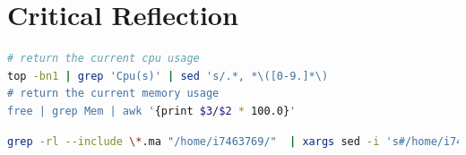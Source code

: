 \documentclass[11pt]{article}
\begin{document}
\section{Critical Reflection}




\newpage
\appendix

\begin{lstlisting}[language=bash, label={lst:cpumem}, caption={Extract from the Python script used to determine which of the computers on the university network are suitable for rendering on. By capturing the output of the following commands I was able to get the current CPU and memory usage.}]
# return the current cpu usage
top -bn1 | grep 'Cpu(s)' | sed 's/.*, *\([0-9.]*\)
# return the current memory usage
free | grep Mem | awk '{print $3/$2 * 100.0}'
\end{lstlisting}

\begin{lstlisting}[language=bash, label={lst:grep}, caption={The bash script used to replace any absolute paths in Maya scene files, and replace them with file paths suitable for use on the render farm. (Modified from this StackOverflow thread~\cite{stackoverflow})}]
grep -rl --include \*.ma "/home/i7463769/"  | xargs sed -i 's#/home/i7463769/#/render/i7463769/#g'
\end{lstlisting}
\end{document}
